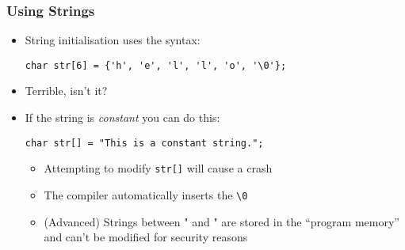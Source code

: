 \documentclass[14pt]{beamer}
\begin{document}

\begin{frame}[fragile]
\frametitle{Using Strings}
\begin{itemize}
\item String initialisation uses the syntax:
\begin{lstlisting}[style=CStyle]
char str[6] = {'h', 'e', 'l', 'l', 'o', '\0'};
\end{lstlisting}
\pause
\item Terrible, isn't it?
\pause
\item If the string is \textit{constant} you can do this:
\begin{lstlisting}[style=CStyle]
char str[] = "This is a constant string.";
\end{lstlisting}
	\begin{itemize}
		\item Attempting to modify \texttt{str[]} will cause a crash
		\item The compiler automatically inserts the \texttt{\textbackslash 0}
		\item (Advanced) Strings between " and " are stored in the ``program memory'' and can't be modified for security reasons
	\end{itemize}
\end{itemize}
\end{frame}
\end{document}
